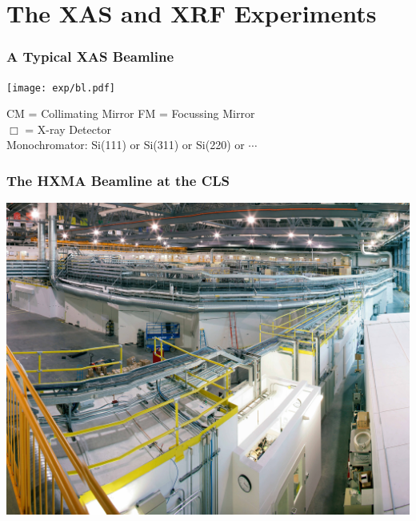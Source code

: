 \documentclass[10pt, xcolor=x11names, compress, handout]{beamer}
\begin{document}
\section[Experiment]{The XAS and XRF Experiments}

\begin{frame}
  \frametitle{A Typical XAS Beamline}

  \begin{center}
    \texttt{[image: exp/bl.pdf]}

    CM = Collimating Mirror \qquad FM = Focussing Mirror\\[1ex]
    {\color{Green4}$\Box$} = X-ray Detector\\[1ex]
    Monochromator: Si(111) or Si(311) or Si(220) or $\cdots$
  \end{center}
\end{frame}
\begin{frame}
  \frametitle{The HXMA Beamline at the CLS}
  \begin{center}
    \includegraphics[width=0.8\linewidth]{exp/hxma.jpg}
  \end{center}
\end{frame}
\end{document}
